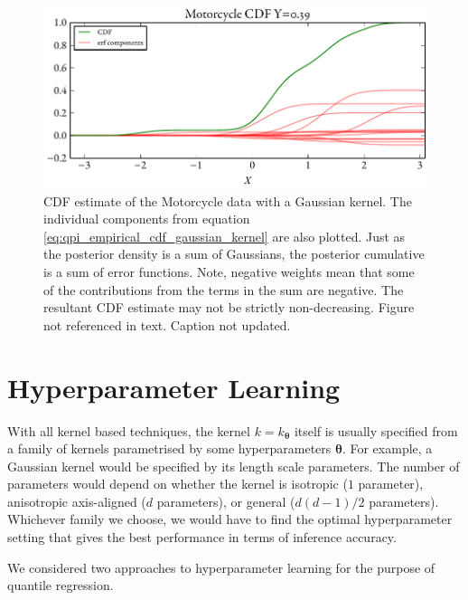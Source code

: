 \documentclass[twoside]{article} \usepackage{aistats2017}
\theoremstyle{definition}
\newcommand{\rv}[1]{{#1}}
\newcommand{\warn}[1]{{\color{red} #1}}
\begin{document}
		\begin{figure}
			\begin{center}
				\includegraphics[width=\columnwidth]{figures/cumulativeexampleerf}
			\end{center}
			\caption{\small CDF estimate of the Motorcycle data with a Gaussian kernel. The individual components from equation \eqref{eq:qpi_empirical_cdf_gaussian_kernel} are also plotted. Just as the posterior density is a sum of Gaussians, the posterior cumulative is a sum of error functions. Note, negative weights mean that some of the contributions from the terms in the sum are negative. The resultant CDF estimate may not be strictly non-decreasing. \warn{Figure not referenced in text. Caption not updated.}}
			\label{fig:cumulativeexampleerf} 
		\end{figure}
		
\section{Hyperparameter Learning}
\label{sec:hyperparameter_learning}

	With all kernel based techniques, the kernel $k = k_{\bm{\theta}}$ itself is usually specified from a family of kernels parametrised by some hyperparameters $\bm{\theta}$. For example, a Gaussian kernel would be specified by its length scale parameters. The number of parameters would depend on whether the kernel is isotropic ($1$ parameter), anisotropic axis-aligned ($d$ parameters), or general ($d(d - 1)/2$ parameters). Whichever family we choose, we would have to find the optimal hyperparameter setting that gives the best performance in terms of inference accuracy.
	
	We considered two approaches to hyperparameter learning for the purpose of quantile regression.
	
	
\end{document}
